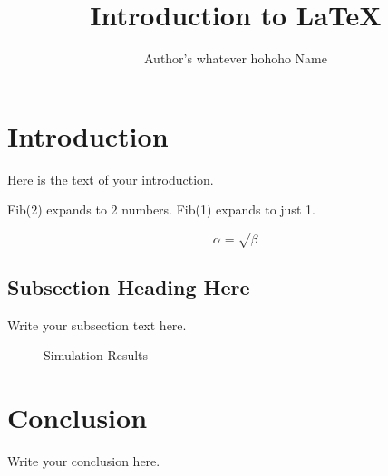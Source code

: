 \documentclass{article}
\begin{document}
\title{Introduction to \LaTeX{}}
\author{Author's whatever hohoho Name}

\maketitle

\begin{abstract}
\end{abstract}

\section{Introduction}
Here is the text of your introduction.

	Fib(2) expands to 2 numbers. Fib(1) expands to just 1.

\begin{equation}
    \label{simple_equation}
    \alpha = \sqrt{ \beta }
\end{equation}

\subsection{Subsection Heading Here}
Write your subsection text here.

\begin{figure}
    \centering
    \caption{Simulation Results}
    \label{simulationfigure}
\end{figure}

\section{Conclusion}
Write your conclusion here.
\end{document}
